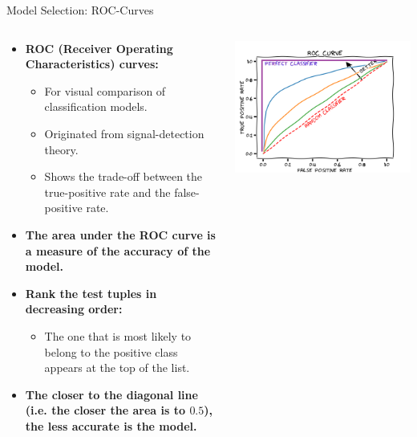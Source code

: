 \begin{frame}{Model Selection: ROC-Curves}
  \begin{columns}
    \begin{column}{0.6\textwidth}
      \begin{itemize}
      \item \textbf{ROC (Receiver Operating Characteristics) curves:}
        \begin{itemize}
        \item For visual comparison of classification models.
        \item Originated from signal-detection theory.
        \item Shows the trade-off between the true-positive rate and the false-positive rate.
        \end{itemize}
      \item \textbf{The area under the ROC curve is a {\color{airforceblue}measure of the accuracy} of the model.}
      \item \textbf{{\color{airforceblue}Rank the test tuples} in decreasing order:}
        \begin{itemize}
        \item The one that is most likely to belong to the positive class appears at the top of the list.
        \end{itemize}
      \item \textbf{The closer to the diagonal line (i.e. the closer the area is to $0.5$), the less accurate is the model.}
      \end{itemize}
    \end{column}
    \begin{column}{0.4\textwidth}
      \vspace{-1cm}
      \centering
      \includegraphics[width=\textwidth]{img/roc-curve.png}

\end{column}
\end{columns}
\end{frame}
